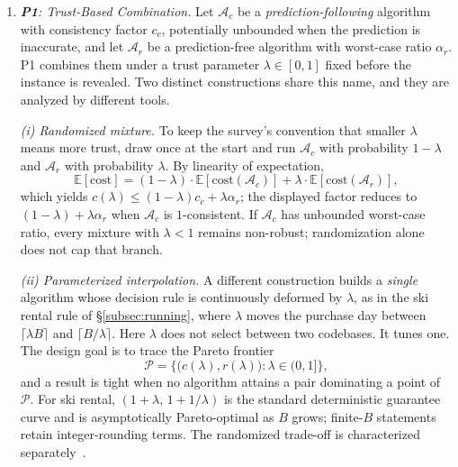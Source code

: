 \documentclass[acmsmall,screen,nonacm]{acmart}
\theoremstyle{acmdefinition}%
\begin{document}
\begin{enumerate}
    \item \emph{\textbf{P1}: Trust-Based Combination.}
    Let $\mathcal{A}_c$ be a \emph{prediction-following} algorithm with consistency factor $c_c$, potentially unbounded when the prediction is inaccurate, and let $\mathcal{A}_r$ be a prediction-free algorithm with worst-case ratio $\alpha_r$. P1 combines them under a trust parameter $\lambda \in [0,1]$ fixed before the instance is revealed. Two distinct constructions share this name, and they are analyzed by different tools.

    \emph{(i) Randomized mixture.} To keep the survey's convention that smaller $\lambda$ means more trust, draw once at the start and run $\mathcal{A}_c$ with probability $1-\lambda$ and $\mathcal{A}_r$ with probability $\lambda$. By linearity of expectation,
    \begin{equation}
        \mathbb{E}[\mathrm{cost}] = (1-\lambda) \cdot \mathbb E[\mathrm{cost}(\mathcal{A}_c)] + \lambda\cdot \mathbb E[\mathrm{cost}(\mathcal{A}_r)],
        \label{eq_p1_mix}
    \end{equation}
    which yields $c(\lambda) \leq (1-\lambda)c_c + \lambda\alpha_r$; the displayed factor reduces to $(1-\lambda)+\lambda\alpha_r$ when $\mathcal{A}_c$ is $1$-consistent. If $\mathcal{A}_c$ has unbounded worst-case ratio, every mixture with $\lambda<1$ remains non-robust; randomization alone does not cap that branch.

    \emph{(ii) Parameterized interpolation.} A different construction builds a \emph{single} algorithm whose decision rule is continuously deformed by $\lambda$, as in the ski rental rule of \S\ref{subsec:running}, where $\lambda$ moves the purchase day between $\lceil \lambda B \rceil$ and $\lceil B/\lambda \rceil$. Here $\lambda$ does not select between two codebases. It tunes one. The design goal is to trace the Pareto frontier
    \begin{equation}
        \mathcal{P} = \Big\{ \big(c(\lambda), r(\lambda)\big) : \lambda \in (0,1] \Big\},
        \label{eq_p1_pareto}
    \end{equation}
    and a result is tight when no algorithm attains a pair dominating a point of $\mathcal{P}$. For ski rental, $(1+\lambda,\,1+1/\lambda)$ is the standard deterministic guarantee curve and is asymptotically Pareto-optimal as $B$ grows; finite-$B$ statements retain integer-rounding terms. The randomized trade-off is characterized separately~\cite{purohit2018improving,gollapudi2019rentorbuy,wei2020optimal}.


\end{enumerate}
\end{document}
